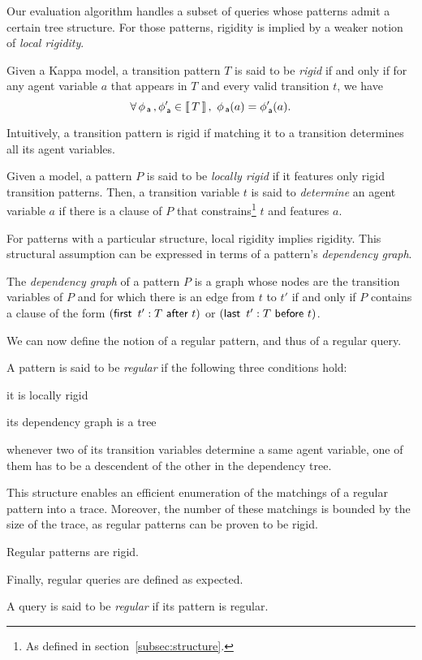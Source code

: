 \documentclass[runningheads]{llncs}
\begin{document}
Our evaluation algorithm handles a subset of queries whose patterns
admit a certain tree structure. For those patterns, rigidity is
implied by a weaker notion of \emph{local rigidity}.
\begin{definition}
  Given a Kappa model, a transition pattern $T$ is said to be
  \emph{rigid} if and only if for any agent variable $a$ that appears
  in $T$ and every valid transition $t$, we have
  \[ \forall\, \phi_{\,\textsf{a}}\,, \phi_{\,\textsf{a}}' \in \left\llbracket \, T \, \right\rrbracket, \ \phi_{\,\textsf{a}}(a)
    = \phi'_{\,\textsf{a}}(a). \]
\end{definition}
Intuitively, a transition pattern is rigid if matching it to a
transition determines all its agent variables.
\begin{definition}
  Given a model, a pattern $P$ is said to be \emph{locally rigid} if
  it features only rigid transition patterns. Then, a transition
  variable $t$ is said to \emph{determine} an agent variable $a$ if
  there is a clause of $P$ that constrains\footnote{As defined in
    section~\ref{subsec:structure}.} $t$ and features $a$.
\end{definition}
For patterns with a particular structure, local rigidity implies
rigidity. This structural assumption can be expressed in terms of a
pattern's \emph{dependency graph}.
\begin{definition}
  The \emph{dependency graph} of a pattern $P$ is a graph whose nodes
  are the transition variables of $P$ and for which there is an edge
  from $t$ to $t'$ if and only if $P$ contains a clause of the form
  $(\textsf{first} \,\ t':T \ \textsf{after} \ t)$ or $(\textsf{last} \,\ t':T \ \textsf{before} \ t)$.
\end{definition}
We can now define the notion of a regular pattern, and thus of a
regular query.
\begin{definition}\label{def:regularity}
  A pattern is said to be \emph{regular} if the following three
  conditions hold:
  \begin{inparaenum}[(i)]
  \item\label{reg:locally-rigid} it is locally rigid
  \item\label{reg:tree} its dependency graph is a tree
  \item\label{reg:well-captured} whenever two of its transition
    variables determine a same agent variable, one of them has to be a
    descendent of the other in the dependency tree.
  \end{inparaenum}
\end{definition}
This structure enables an efficient enumeration of the matchings of a
regular pattern into a trace. Moreover, the number of
these matchings is bounded by the size of the trace, as regular
patterns can be proven to be rigid.
\begin{proposition}\label{prop:regular-rigid}
  Regular patterns are rigid.
\end{proposition}
Finally, regular queries are defined as expected.
\begin{definition}
  A query is said to be \emph{regular} if its pattern is regular.
\end{definition}
\end{document}
